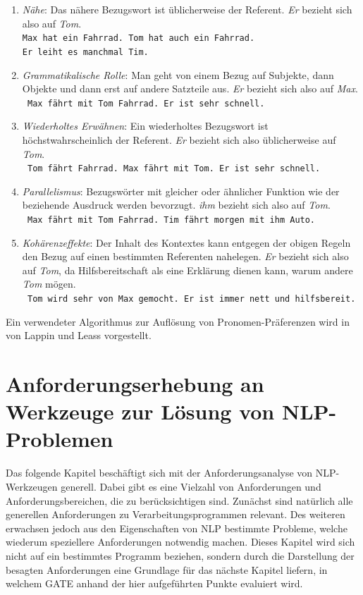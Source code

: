 \documentclass[12pt]{report}
\begin{document}
\begin{enumerate}
\item \textit{Nähe}: Das nähere Bezugswort ist üblicherweise der Referent. \textit{\glqq  Er\grqq{}} bezieht sich also auf \textit{Tom}.\\
\tt Max hat ein Fahrrad. Tom hat auch ein Fahrrad. \\Er leiht es manchmal Tim.
\rm
\item \textit{Grammatikalische Rolle}: Man geht von einem Bezug auf Subjekte, dann Objekte und dann erst auf andere Satzteile aus. \textit{\glqq  Er\grqq{}} bezieht sich also auf \textit{Max}.\\
\tt
Max fährt mit Tom Fahrrad. Er ist sehr schnell.
\rm
\item \textit{Wiederholtes Erwähnen}: Ein wiederholtes Bezugswort ist höchstwahrscheinlich der Referent. \textit{\glqq  Er\grqq{}} bezieht sich also üblicherweise auf \textit{Tom}.\\
\tt
Tom fährt Fahrrad. Max fährt mit Tom. Er ist sehr schnell.
\rm
\item \textit{Parallelismus}: Bezugswörter mit gleicher oder ähnlicher Funktion wie der beziehende Ausdruck werden bevorzugt. \textit{\glqq  ihm\grqq{}} bezieht sich also auf \textit{Tom}. \\
\tt
Max fährt mit Tom Fahrrad. Tim fährt morgen mit ihm Auto.
\rm
\item \textit{Kohärenzeffekte}: Der Inhalt des Kontextes kann entgegen der obigen Regeln den Bezug auf einen bestimmten Referenten nahelegen. \textit{\glqq  Er\grqq{}} bezieht sich also auf \textit{Tom}, da Hilfsbereitschaft als eine Erklärung dienen kann, warum andere \textit{Tom} mögen.\\
\tt
Tom wird sehr von Max gemocht. Er ist immer nett und hilfsbereit.
\rm
\end{enumerate}
Ein verwendeter Algorithmus zur Auflösung von Pronomen-Präferenzen wird in \cite{ll94} von Lappin und Leass vorgestellt.\\

\chapter[Anforderungserhebung an NLP-Werkzeuge]{Anforderungserhebung an Werkzeuge zur Lösung von NLP-Problemen}
Das folgende Kapitel beschäftigt sich mit der Anforderungsanalyse von NLP-Werkzeugen generell. Dabei gibt es eine Vielzahl von Anforderungen und Anforderungsbereichen, die zu berücksichtigen sind. Zunächst sind natürlich alle generellen Anforderungen zu Verarbeitungsprogrammen relevant. Des weiteren erwachsen jedoch aus den Eigenschaften von NLP bestimmte Probleme, welche wiederum speziellere Anforderungen notwendig machen. Dieses Kapitel wird sich nicht auf ein bestimmtes Programm beziehen, sondern durch die Darstellung der besagten Anforderungen eine Grundlage für das nächste Kapitel liefern, in welchem GATE anhand der hier aufgeführten Punkte evaluiert wird. 
\end{document}

